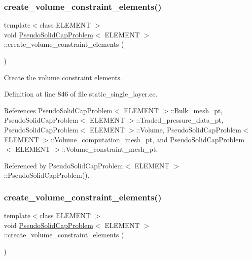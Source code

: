 \subsubsection{\texorpdfstring{create\+\_\+volume\+\_\+constraint\+\_\+elements()}{create\_volume\_constraint\_elements()}\hspace{0.1cm}{\footnotesize\ttfamily [1/2]}}
{\footnotesize\ttfamily template$<$class E\+L\+E\+M\+E\+NT $>$ \\
void \hyperlink{classPseudoSolidCapProblem}{Pseudo\+Solid\+Cap\+Problem}$<$ E\+L\+E\+M\+E\+NT $>$\+::create\+\_\+volume\+\_\+constraint\+\_\+elements (\begin{DoxyParamCaption}{ }\end{DoxyParamCaption})\hspace{0.3cm}{\ttfamily [private]}}



Create the volume constraint elements. 



Definition at line 846 of file static\+\_\+single\+\_\+layer.\+cc.



References Pseudo\+Solid\+Cap\+Problem$<$ E\+L\+E\+M\+E\+N\+T $>$\+::\+Bulk\+\_\+mesh\+\_\+pt, Pseudo\+Solid\+Cap\+Problem$<$ E\+L\+E\+M\+E\+N\+T $>$\+::\+Traded\+\_\+pressure\+\_\+data\+\_\+pt, Pseudo\+Solid\+Cap\+Problem$<$ E\+L\+E\+M\+E\+N\+T $>$\+::\+Volume, Pseudo\+Solid\+Cap\+Problem$<$ E\+L\+E\+M\+E\+N\+T $>$\+::\+Volume\+\_\+computation\+\_\+mesh\+\_\+pt, and Pseudo\+Solid\+Cap\+Problem$<$ E\+L\+E\+M\+E\+N\+T $>$\+::\+Volume\+\_\+constraint\+\_\+mesh\+\_\+pt.



Referenced by Pseudo\+Solid\+Cap\+Problem$<$ E\+L\+E\+M\+E\+N\+T $>$\+::\+Pseudo\+Solid\+Cap\+Problem().

\mbox{\label{classPseudoSolidCapProblem_a0289801610e2bc864c67d4d8557d56b1}} 
\subsubsection{\texorpdfstring{create\+\_\+volume\+\_\+constraint\+\_\+elements()}{create\_volume\_constraint\_elements()}\hspace{0.1cm}{\footnotesize\ttfamily [2/2]}}
{\footnotesize\ttfamily template$<$class E\+L\+E\+M\+E\+NT $>$ \\
void \hyperlink{classPseudoSolidCapProblem}{Pseudo\+Solid\+Cap\+Problem}$<$ E\+L\+E\+M\+E\+NT $>$\+::create\+\_\+volume\+\_\+constraint\+\_\+elements (\begin{DoxyParamCaption}{ }\end{DoxyParamCaption})\hspace{0.3cm}{\ttfamily [private]}}



